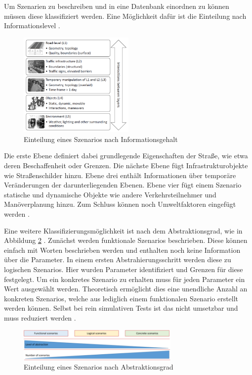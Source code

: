 Um Szenarien zu beschreiben und in eine Datenbank einordnen zu können müssen diese klassifiziert werden. Eine Möglichkeit dafür ist die Einteilung nach Informationslevel \cite{Nalic2020}\cite{Bagschik2018}.
\begin{figure}[H]
    \centering
    \includegraphics[width=0.5\textwidth]{figures/2_Grundlagen/layer_model.png}
    \caption{Einteilung eines Szenarios nach Informationsgehalt \cite{Bagschik2018}}
    \label{fig:layer_model}
\end{figure}
Die erste Ebene definiert dabei grundlegende Eigenschaften der Straße, wie etwa deren Beschaffenheit oder Grenzen. Die nächste Ebene fügt Infrastrukturobjekte wie Straßenschilder hinzu. Ebene drei enthält Informationen über temporäre Veränderungen der darunterliegenden Ebenen. Ebene vier fügt einem Szenario statische und dynamische Objekte wie andere Verkehrsteilnehmer und Manöverplanung hinzu. Zum Schluss können noch Umweltfaktoren eingefügt werden \cite{Bagschik2018}.

Eine weitere Klassifizierungsmöglichkeit ist nach dem Abstraktionsgrad, wie in Abbildung \ref{fig:scenario_level} \cite{Nalic2020}\cite{menzel2018scenarios}. Zunächst werden funktionale Szenarios beschrieben. Diese können einfach mit Worten beschrieben werden und enthalten noch keine Information über die Parameter. In einem ersten Abstrahierungsschritt werden diese zu logischen Szenarios. Hier wurden Parameter identifiziert und Grenzen für diese festgelegt. Um ein konkretes Szenario zu erhalten muss für jeden Parameter ein Wert ausgewählt werden. Theoretisch ermöglicht dies eine unendliche Anzahl an konkreten Szenarios, welche aus lediglich einem funktionalen Szenario erstellt werden können. Selbst bei rein simulativen Tests ist das nicht umsetzbar und muss reduziert werden \cite{menzel2018scenarios}.
\begin{figure}
    \centering
    \includegraphics[width=0.7\textwidth]{figures/2_Grundlagen/scenario_level.png}
    \caption{Einteilung eines Szenarios nach Abstraktionsgrad \cite{menzel2018scenarios}}
    \label{fig:scenario_level}
\end{figure}

